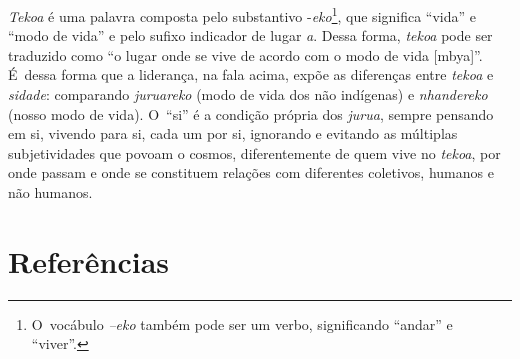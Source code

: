 \emph{Tekoa} é uma palavra composta pelo substantivo -\emph{eko}\footnote{O~vocábulo
\emph{--eko} também pode ser um verbo, significando ``andar'' e ``viver''.}, que
significa ``vida'' e ``modo de vida'' e pelo sufixo indicador de lugar \emph{a}.
Dessa forma, \emph{tekoa} pode ser traduzido como ``o lugar onde se vive de
acordo com o modo de vida [mbya]''. É~dessa forma que a liderança, na
fala acima, expõe as diferenças entre \emph{tekoa} e \emph{sidade}: comparando
\emph{juruareko} (modo de vida dos não indígenas) e \emph{nhandereko} (nosso modo de
vida). O~``si'' é a condição própria dos \emph{jurua}, sempre pensando em si,
vivendo para si, cada um por si, ignorando e evitando as múltiplas
subjetividades que povoam o cosmos, diferentemente de quem vive no
\emph{tekoa}, por onde passam e onde se constituem relações com diferentes
coletivos, humanos e não humanos.

\section{Referências} 

